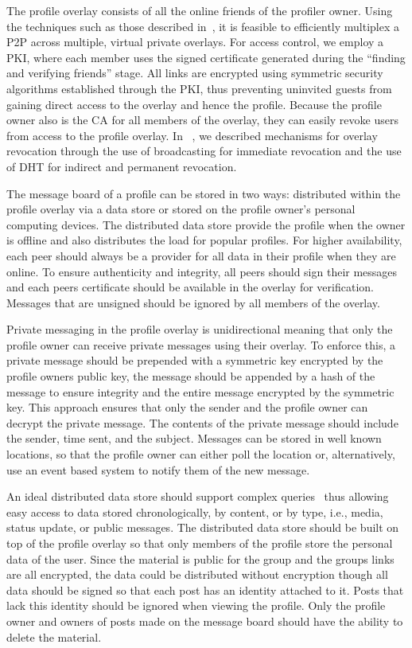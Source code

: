 \documentclass[letterpaper,twocolumn,10pt]{article}
\begin{document}
The profile overlay consists of all the online friends of the profiler owner.
Using the techniques such as those described in~\cite{icdcs10}, it is feasible
to efficiently multiplex a P2P across multiple, virtual private overlays.
For access control, we employ a PKI, where each member uses the signed certificate
generated during the ``finding and verifying friends'' stage.  All links are
encrypted using symmetric security algorithms established through the PKI,
thus preventing uninvited guests from gaining direct access to the overlay and
hence the profile.  Because the profile owner also is the CA for all members of
the overlay, they can easily revoke users from access to the profile overlay.
In ~\cite{icdcs10}, we described mechanisms for overlay revocation through the
use of broadcasting for immediate revocation and the use of DHT for indirect
and permanent revocation.

The message board of a profile can be stored in two ways: distributed within the
profile overlay via a data store or stored on the profile owner's personal
computing devices.  The distributed data store provide the profile when the
owner is offline and also distributes the load for popular profiles.  For
higher availability, each peer should always be a provider for all data in their
profile when they are online.  To ensure authenticity and integrity, all peers
should sign their messages and each peers certificate should be available in
the overlay for verification.  Messages that are unsigned should be ignored
by all members of the overlay.

Private messaging in the profile overlay is unidirectional meaning that only
the profile owner can receive private messages using their overlay.  To
enforce this, a private message should be prepended with a symmetric key
encrypted by the profile owners public key, the message should be appended
by a hash of the message to ensure integrity and the entire message encrypted
by the symmetric key.  This approach ensures that only the sender and the
profile owner can decrypt the private message.  The contents of the private
message should include the sender, time sent, and the subject.  Messages can
be stored in well known locations, so that the profile owner can either poll
the location or, alternatively, use an event based system to notify them of
the new message.

An ideal distributed data store should support complex queries~\cite{complex_queries}
thus allowing easy access to data stored chronologically, by content, or by type,
i.e., media, status update, or public messages.  The distributed data store
should be built on top of the profile overlay so that only members of the
profile store the personal data of the user.  Since the material is public for
the group and the groups links are all encrypted, the data could be distributed
without encryption though all data should be signed so that each post has an
identity attached to it.  Posts that lack this identity should be ignored when
viewing the profile.  Only the profile owner and owners of posts made on the
message board should have the ability to delete the material.
\end{document}
